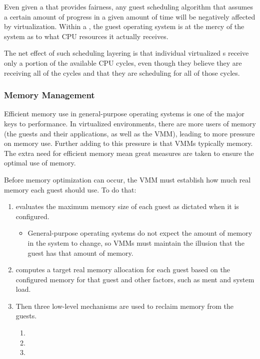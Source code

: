 Even given a  that provides fairness, any guest  scheduling algorithm that assumes a certain amount of progress in a given amount of time will be negatively affected by virtualization.
Within a , the guest operating system is at the mercy of the  system as to what CPU resources it actually receives.

The net effect of such scheduling layering is that individual virtualized s receive only a portion of the available CPU cycles, even though they believe they are receiving all of the cycles and that they are scheduling for all of those cycles.

\subsubsection{Memory Management}\label{subsubsec:VM_Memory_Management}
Efficient memory use in general-purpose operating systems is one of the major keys to performance.
In virtualized environments, there are more users of memory (the guests and their applications, as well as the VMM), leading to more pressure on memory use.
Further adding to this pressure is that VMMs typically  memory.
The extra need for efficient memory mean great measures are taken to ensure the optimal use of memory.

Before memory optimization can occur, the VMM must establish how much real memory each guest should use.
To do that:
\begin{enumerate}[noitemsep]
\item {} evaluates the maximum memory size of each guest as dictated when it is configured.
  \begin{itemize}[noitemsep]
  \item General-purpose operating systems do not expect the amount of memory in the system to change, so VMMs must maintain the illusion that the guest has that amount of memory.
  \end{itemize}
\item {} computes a target real memory allocation for each guest based on the configured memory for that guest and other factors, such as ment and system load.
\item Then three low-level mechanisms are used to reclaim memory from the guests.
  \begin{enumerate}[noitemsep]
  \item {}
  \item {}
  \item {}
  \end{enumerate}
\end{enumerate}

